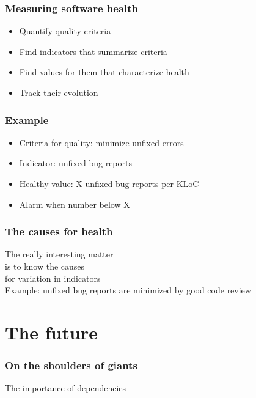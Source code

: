 \documentclass[17pt,aspectratio=169,hyperref=pdfusetitle]{beamer}
\begin{document}
\begin{frame}[fragile]
  \frametitle{Measuring software health}

  \begin{itemize}
  \item Quantify quality criteria
  \item Find indicators that summarize criteria
  \item Find values for them that characterize health
  \item Track their evolution
  \end{itemize}
\end{frame}

\begin{frame}[fragile]
  \frametitle{Example}

  \begin{itemize}
  \item Criteria for quality: minimize unfixed errors 
  \item Indicator: unfixed bug reports
  \item Healthy value: X unfixed bug reports per KLoC
  \item Alarm when number below X
  \end{itemize}
\end{frame}

\begin{frame}[fragile]
  \frametitle{The causes for health}

  The really interesting matter \\
  is to know the causes \\
  for variation in indicators \\

  Example: unfixed bug reports are minimized by good code review
  
\end{frame}


\section{The future}

\begin{frame}[fragile]
  \frametitle{On the shoulders of giants}

  The importance of dependencies
  
\end{frame}
\end{document}
